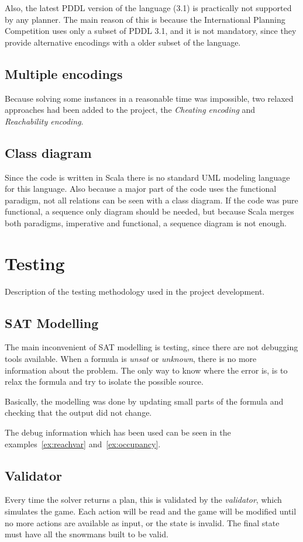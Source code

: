 \documentclass{report}
\theoremstyle{plain}
\begin{document}
Also, the latest PDDL version of the language (3.1) is practically not supported by any planner. The main reason of this is because the International Planning Competition uses only a subset of PDDL 3.1, and it is not mandatory, since they provide alternative encodings with a older subset of the language.

\subsection{Multiple encodings}
Because solving some instances in a reasonable time was impossible, two relaxed approaches had been added to the project, the \emph{Cheating encoding} and \emph{Reachability encoding}.

\subsection{Class diagram}
Since the code is written in Scala there is no standard UML modeling language for this language. Also because a major part of the code uses the functional paradigm, not all relations can be seen with a class diagram. If the code was pure functional, a sequence only diagram should be needed, but because Scala merges both paradigms, imperative and functional, a sequence diagram is not enough. 

\section{Testing}
Description of the testing methodology used in the project development.

\subsection{SAT Modelling}
The main inconvenient of SAT modelling is  testing, since  there are not debugging tools available. When a formula is \emph{unsat} or \emph{unknown}, there is no more information about the problem. The only way to know where the error is, is to relax the formula and try to isolate the possible source.

Basically, the modelling was done by updating small parts of the formula and checking that the output did not change.

The debug information which has been used can be seen in the examples~\ref{ex:reachvar} and~\ref{ex:occupancy}.

\subsection{Validator}
Every time the solver returns a plan, this is validated by the \emph{validator}, which simulates the game. Each action will be read and  the game will be modified until no more actions are available as input, or the state is invalid. The final state must have all the snowmans built to be valid.
\end{document}
